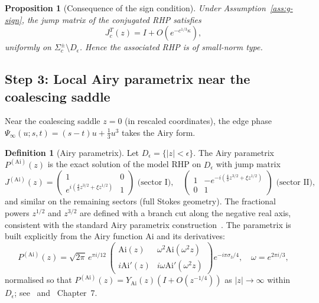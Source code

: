 \documentclass[12pt,a4paper]{amsart}
\newtheorem{proposition}[theorem]{Proposition}
\theoremstyle{definition}
\newtheorem{definition}[theorem]{Definition}
\theoremstyle{remark}
\newcommand{\Ai}{\mathrm{Ai}}
\begin{document}
\begin{proposition}[Consequence of the sign condition]
\label{prop:g-implies-small-norm}
Under Assumption~\ref{ass:g-sign}, the jump matrix of the conjugated
RHP satisfies
\[
  J_c^T(z) = I + O(e^{-c^{1/3}\kappa}),
\]
uniformly on $\Sigma_c^\pm \setminus D_\epsilon$.
Hence the associated RHP is of small-norm type.
\end{proposition}

\subsection{Step 3: Local Airy parametrix near the coalescing saddle}

Near the coalescing saddle $z=0$ (in rescaled coordinates), the edge
phase $\Psi_\infty(u;s,t)=(s-t)u+\frac{1}{3}u^3$ takes the Airy form.

\begin{definition}[Airy parametrix]
\label{def:airy-parametrix}
Let $D_\epsilon=\{|z|<\epsilon\}$.
The Airy parametrix $P^{(\mathrm{Ai})}(z)$ is the exact solution
of the model RHP on $D_\epsilon$ with jump matrix
\[
  J^{(\mathrm{Ai})}(z)
  =\begin{pmatrix}1&0\\ e^{i(\frac{4}{3}z^{3/2}+\xi z^{1/2})} & 1\end{pmatrix}
  \text{ (sector I)},
  \quad
  \begin{pmatrix}1& -e^{-i(\frac{4}{3}z^{3/2}+\xi z^{1/2})} \\ 0 & 1\end{pmatrix}
  \text{ (sector II)},
\]
and similar on the remaining sectors (full Stokes geometry).
The fractional powers $z^{1/2}$ and $z^{3/2}$ are defined with a branch
cut along the negative real axis, consistent with the standard Airy
parametrix construction~\cite{Deift1999}.
The parametrix is built explicitly from the Airy function $\Ai$
and its derivatives:
\begin{equation}\label{eq:airy-parametrix-explicit}
  P^{(\mathrm{Ai})}(z)
  =\sqrt{2\pi}\,e^{\pi i/12}\,
  \begin{pmatrix}\Ai(z) & \omega^2\Ai(\omega^2 z)\\
  i\Ai'(z) & i\omega\Ai'(\omega^2 z)\end{pmatrix}
  e^{-i\pi\sigma_3/4},
  \quad \omega=e^{2\pi i/3},
\end{equation}
normalised so that $P^{(\mathrm{Ai})}(z)=Y_{\mathrm{Ai}}(z)(I+O(z^{-1/4}))$
as $|z|\to\infty$ within $D_\epsilon$; see~\cite{TraWid1994} and~\cite{Deift1999}
Chapter~7.
\end{definition}
\end{document}
